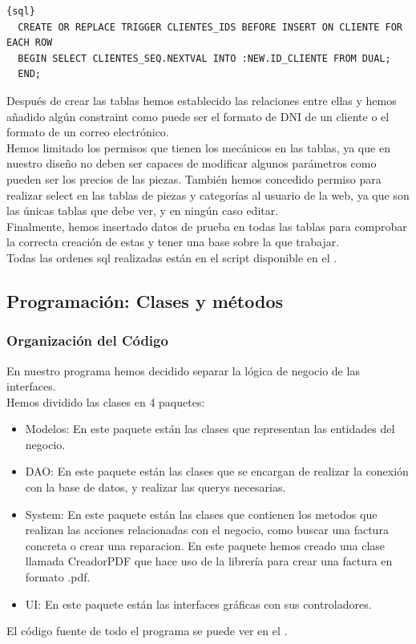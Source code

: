 \documentclass{article}
\begin{document}
{\begin{lstlisting}{sql}
  CREATE OR REPLACE TRIGGER CLIENTES_IDS BEFORE INSERT ON CLIENTE FOR EACH ROW
  BEGIN SELECT CLIENTES_SEQ.NEXTVAL INTO :NEW.ID_CLIENTE FROM DUAL;
  END;
\end{lstlisting}
Después de crear las tablas hemos establecido las relaciones entre ellas y hemos añadido algún constraint como puede ser el formato de DNI de un cliente o el formato de un correo electrónico.\\ 
Hemos limitado los permisos que tienen los mecánicos en las tablas, ya que en nuestro diseño no deben ser capaces de modificar algunos parámetros como pueden ser los precios de las piezas. También hemos concedido permiso para
realizar select en las tablas de piezas y categorías al usuario de la web, ya que son las únicas tablas que debe ver, y en ningún caso editar.\\ 
Finalmente, hemos insertado datos de prueba en todas las tablas para comprobar la correcta creación de estas y tener una base sobre la que trabajar.\\ 
Todas las ordenes sql realizadas están en el script disponible en el \href{https://github.com/DreaMan92/TrabajoTaller/blob/main/BBDD/Oracle/Script.sql}{\color{red}{repositorio de github}}.
}

\subsection{Programación: Clases y métodos}
  \subsubsection{Organización del Código}
  En nuestro programa hemos decidido separar la lógica de negocio de las interfaces.\\ 
  Hemos dividido las clases en 4 paquetes:\\
  \begin{itemize}
    \item Modelos: En este paquete están las clases que representan las entidades del negocio. 
    \item DAO: En este paquete están las clases que se encargan de realizar la conexión con la base de datos, y realizar las querys necesarias.
    \item System: En este paquete están las clases que contienen los metodos que realizan las acciones relacionadas con el negocio, como buscar una factura concreta o crear una reparacion. En este paquete hemos creado una clase llamada CreadorPDF 
    que hace uso de la librería \href{https://github.com/itext}{\color{red}{iText}} para crear una factura en formato .pdf.
    \item UI: En este paquete están las interfaces gráficas con sus controladores. 
  \end{itemize}
  El código fuente de todo el programa se puede ver en el \href{https://github.com/martinfgar/TallerProgramacion}{\color{red}{repositorio de github del proyecto}}.
\end{document}
